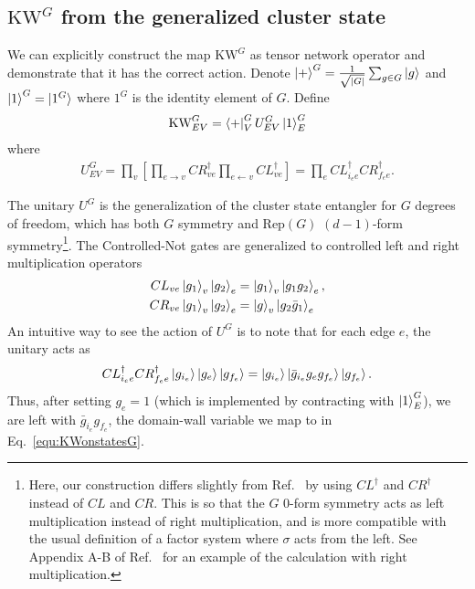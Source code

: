 \documentclass[nofootinbib,prx,twocolumn,showpacs,superscriptaddress,notitlepage,amsmath,amssymb]{revtex4-2}
\theoremstyle{definition}
\def\KW{\text{KW}}
\def\Rep{\text{Rep}}
\def\bra#1{\mathinner{\langle{#1}|}}
\def\ket#1{\mathinner{|{#1}\rangle}}
\begin{document}
\subsection{$\KW^G$ from the generalized cluster state}\label{app:Gclustestate}
We can explicitly construct the map $\KW^G$  as tensor network operator and demonstrate that it has the correct action. Denote $\ket{+}^G = \frac{1}{\sqrt{|G|}}\sum_{g\in G} \ket{g}$ and $\ket{1}^G = \ket{1^G}$ where $1^G$ is the identity element of $G$. Define
\begin{align}
    \KW^G_{EV} = \bra{+}^G_V U_{EV}^G \ket{1}^G_E
    \label{eq:KWGimplement}
\end{align}
where
\begin{align}
   U_{EV}^G=\prod_v\left [ \prod_{e\rightarrow v} CR^\dagger_{ve} \prod_{e\leftarrow v} CL^\dagger_{ve}  \right] = \prod_e CL^\dagger_{i_ee} CR^\dagger_{f_ee}.
   \label{eq:UG}
\end{align}

The unitary $U^G$ is the generalization of the cluster state entangler for $G$ degrees of freedom, which has both $G$ symmetry and $\Rep(G)$ $(d-1)$-form symmetry\footnote{Here, our construction differs slightly from Ref.~ by using $CL^\dagger$ and $CR^\dagger$ instead of $CL$ and $CR$. This is so that the $G$ 0-form symmetry acts as left multiplication instead of right multiplication, and is more compatible with the usual definition of a factor system where $\sigma$ acts from the left. See Appendix A-B of Ref.~ for an example of the calculation with right multiplication.}. The Controlled-Not gates are generalized to controlled left and right multiplication operators
\begin{align}
\begin{split}
CL_{ve} \ket{g_1}_v\ket{g_2}_e &= \ket{g_1}_v\ket{g_1g_2}_e, \\ 
CR_{ve} \ket{g_1}_v\ket{g_2}_e &= \ket{g}_v\ket{g_2\bar g_1}_e
\end{split}
\label{eq:controlled-not}
\end{align}
An intuitive way to see the action of $U^G$ is to note that for each edge $e$, the unitary acts as
\begin{align}
    CL^\dagger_{i_ee}CR^\dagger_{f_ee}\ket{g_{i_e}}\ket{g_{e}}\ket{g_{f_e}} = \ket{g_{i_e}}\ket{\bar g_{i_e}g_{e} g_{f_e}} \ket{g_{f_e}}.
    \label{eq:clusterstateproperty}
\end{align}
Thus, after setting $g_e=1$ (which is implemented by contracting with $\ket{1}^G_E$), we are left with $\bar g_{i_e} g_{f_e}$, the domain-wall variable we map to in Eq.~\eqref{equ:KWonstatesG}.
\end{document}

